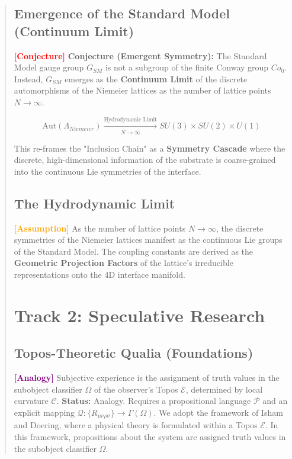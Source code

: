 \documentclass[11pt,titlepage]{article}
\newcommand{\curvature}{\mathcal{C}}
\newcommand{\topos}{\mathcal{E}}
\newcommand{\classifier}{\Omega}
\newcommand{\tagass}{\textcolor{orange}{\textbf{[Assumption]}} }
\newcommand{\tagconj}{\textcolor{red}{\textbf{[Conjecture]}} }
\newcommand{\taganal}{\textcolor{purple}{\textbf{[Analogy]}} }
\begin{document}
\begin{abstract}
\subsection{Emergence of the Standard Model (Continuum Limit)}
\tagconj \textbf{Conjecture (Emergent Symmetry):} The Standard Model gauge group $G_{SM}$ is not a subgroup of the finite Conway group $Co_0$. Instead, $G_{SM}$ emerges as the \textbf{Continuum Limit} of the discrete automorphisms of the Niemeier lattices as the number of lattice points $N \to \infty$.

\begin{equation}
\text{Aut}(\Lambda_{Niemeier}) \xrightarrow[N \to \infty]{\text{Hydrodynamic Limit}} SU(3) \times SU(2) \times U(1)
\end{equation}

This re-frames the "Inclusion Chain" as a \textbf{Symmetry Cascade} where the discrete, high-dimensional information of the substrate is coarse-grained into the continuous Lie symmetries of the interface.


\subsection{The Hydrodynamic Limit}
\tagass As the number of lattice points $N \to \infty$, the discrete symmetries of the Niemeier lattices manifest as the continuous Lie groups of the Standard Model. The coupling constants are derived as the \textbf{Geometric Projection Factors} of the lattice's irreducible representations onto the 4D interface manifold.

\section{Track 2: Speculative Research}

\subsection{Topos-Theoretic Qualia (Foundations)}
\taganal Subjective experience is the assignment of truth values in the subobject classifier $\classifier$ of the observer's Topos $\topos$, determined by local curvature $\curvature$.
\textbf{Status:} Analogy. Requires a propositional language $\mathcal{P}$ and an explicit mapping $\mathcal{Q}: \{R_{\mu\nu\rho\sigma}\} \to \Gamma(\Omega)$. We adopt the framework of Isham and Doering, where a physical theory is formulated within a Topos $\topos$. In this framework, propositions about the system are assigned truth values in the subobject classifier $\classifier$.


\end{abstract}
\end{document}
